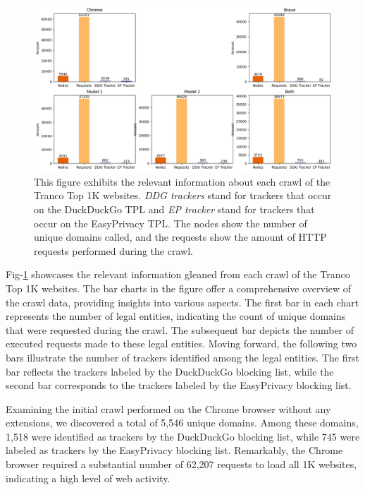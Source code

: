 \begin{figure}[ht!]  
  \centering
      \includegraphics[width=\linewidth, keepaspectratio]{images/CrawlPlot.png}
  \caption{This figure exhibits the relevant information about each crawl of the Tranco Top 1K websites. \emph{DDG trackers} stand for
  trackers that occur on the DuckDuckGo TPL and \emph{EP tracker} stand for trackers that occur on the EasyPrivacy TPL. The nodes show
the number of unique domains called, and the requests show the amount of HTTP requests performed during the crawl.}
  \label{fig:CrawlPlot}
\end{figure}
Fig-\ref{fig:CrawlPlot} showcases the relevant information gleaned from each crawl of the Tranco Top 1K websites. The bar charts in
the figure offer a comprehensive overview of the crawl data, providing insights into various aspects. The first bar in each
chart represents the number of legal entities, indicating the count of unique domains that were requested during the crawl.
The subsequent bar depicts the number of executed requests made to these legal entities. Moving forward, the following two bars
illustrate the number of trackers identified among the legal entities. The first bar reflects the trackers labeled by the DuckDuckGo
blocking list, while the second bar corresponds to the trackers labeled by the EasyPrivacy blocking list.

Examining the initial crawl performed on the Chrome browser without any extensions, we discovered a total of 5,546 unique
domains. Among these domains, 1,518 were identified as trackers by the DuckDuckGo blocking list, while 745 were labeled
as trackers by the EasyPrivacy blocking list. Remarkably, the Chrome browser required a substantial number of 62,207
requests to load all 1K websites, indicating a high level of web activity.

